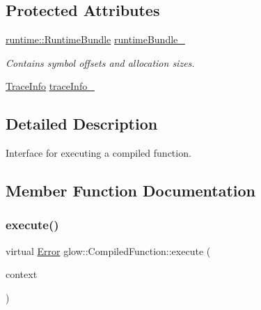 \subsection*{Protected Attributes}
\begin{DoxyCompactItemize}
\item 
\mbox{\label{classglow_1_1_compiled_function_a283bc720af67acad21e6fe4d87c2e2ab}} 
\hyperlink{classglow_1_1runtime_1_1_runtime_bundle}{runtime\+::\+Runtime\+Bundle} \hyperlink{classglow_1_1_compiled_function_a283bc720af67acad21e6fe4d87c2e2ab}{runtime\+Bundle\+\_\+}
\begin{DoxyCompactList}\small\item\em Contains symbol offsets and allocation sizes. \end{DoxyCompactList}\item 
\hyperlink{structglow_1_1_trace_info}{Trace\+Info} \hyperlink{classglow_1_1_compiled_function_a278d778b419f4cc47de002c9eae62857}{trace\+Info\+\_\+}
\end{DoxyCompactItemize}


\subsection{Detailed Description}
Interface for executing a compiled function. 

\subsection{Member Function Documentation}
\mbox{\label{classglow_1_1_compiled_function_ac8dd94f2ee7129a435f1701b6a9f419e}} 
\subsubsection{\texorpdfstring{execute()}{execute()}}
{\footnotesize\ttfamily virtual \hyperlink{namespaceglow_afdb176c3a672ef66db0ecfc19a8d39bf}{Error} glow\+::\+Compiled\+Function\+::execute (\begin{DoxyParamCaption}\item[{\hyperlink{classglow_1_1_execution_context}{Execution\+Context} $\ast$}]{context }\end{DoxyParamCaption})\hspace{0.3cm}{\ttfamily [pure virtual]}}


